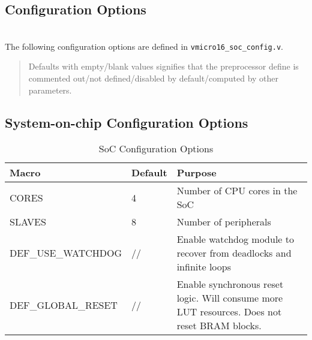 \begin{appendices}
\chapter{Configuration Options}
\label{sect:config}
\startcontents[chapters]

\noindent\\
The following configuration options are defined in \verb|vmicro16_soc_config.v|.

\begin{quote}
Defaults with empty/blank values signifies that the preprocessor define is commented out/not defined/disabled by default/computed by other parameters.
\end{quote}

\section{System-on-chip Configuration Options}
\begin{table}[H]
\centering
\label{tab:isa}
\begin{tabularx}{\textwidth}{l|l|p{8cm}}
Macro      & Default & Purpose                         \\ 
\hline
CORES  & 4       & Number of CPU cores in the SoC  \\
SLAVES & 8       & Number of peripherals  \\    
DEF\_USE\_WATCHDOG & //  & Enable watchdog module to recover from deadlocks and infinite loops \\    
DEF\_GLOBAL\_RESET           & //      & Enable synchronous reset logic. Will consume more LUT resources. Does not reset BRAM blocks.\\
\end{tabularx}
\caption{SoC Configuration Options}
\end{table}


\end{appendices}
